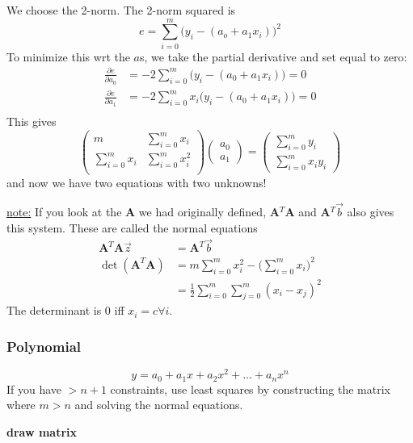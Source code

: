 \documentclass[12pt]{article}
\newcommand{\ve}[1]{\ensuremath{\mathbf{#1}}}
\begin{document}
We choose the 2-norm. The 2-norm squared is
\[e = \sum_{i=0}^m \bigl(y_i - (a_o + a_1 x_i)\bigr)^2\]
%
To minimize this wrt the $a$s, we take the partial derivative and set equal to zero:
%
\begin{align}
\frac{\partial e}{\partial a_0} &= -2 \sum_{i=0}^m \bigl(y_i - (a_0 + a_1 x_i)\bigr) = 0 \\
%
\frac{\partial e}{\partial a_1} &= -2 \sum_{i=0}^m x_i \bigl(y_i - (a_0 + a_1 x_i)\bigr) = 0 \\
\end{align}
%
This gives
%
\begin{equation}
\begin{pmatrix}
m                & \sum_{i=0}^m x_i \\
\sum_{i=0}^m x_i & \sum_{i=0}^m x_i^2 \\ 
\end{pmatrix}
\begin{pmatrix}
a_0 \\ a_1
\end{pmatrix} =
\begin{pmatrix}
\sum_{i=0}^m y_i \\ \sum_{i=0}^m x_i y_i
\end{pmatrix}
\end{equation}
%
and now we have two equations with two unknowns! 

\underline{note:} If you look at the \ve{A} we had originally defined, \ve{A}$^T$\ve{A} and \ve{A}$^T\vec{b}$ also gives this system. These are called the normal equations
%
\begin{align}
\ve{A}^T\ve{A} \vec{z} &= \ve{A}^T\vec{b} \\
%
\det(\ve{A}^T\ve{A}) &= m \sum_{i=0}^m x_i^2 -  \bigl(\sum_{i=0}^m x_i\bigr)^2 \\
%
&= \frac{1}{2} \sum_{i=0}^m \sum_{j=0}^m (x_i - x_j)^2
\end{align}
%
The determinant is 0 iff $x_i=c \forall i$.

\subsubsection{Polynomial}
\[y = a_0 + a_1 x + a_2 x^2 + \dots +a_n x^n\]
If you have $> n+1$ constraints, use least squares by constructing the matrix where $m>n$ and solving the normal equations.

\textbf{draw matrix}

\end{document}
